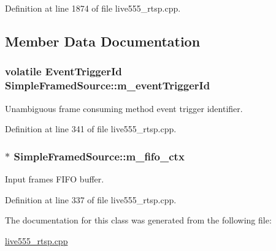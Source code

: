 Definition at line 1874 of file live555\+\_\+rtsp.\+cpp.



\subsection{Member Data Documentation}
\subsubsection[{\texorpdfstring{m\+\_\+event\+Trigger\+Id}{m_eventTriggerId}}]{\setlength{\rightskip}{0pt plus 5cm}volatile Event\+Trigger\+Id Simple\+Framed\+Source\+::m\+\_\+event\+Trigger\+Id}\hypertarget{classSimpleFramedSource_a6de7be242a550522e914316487fa112e}{}\label{classSimpleFramedSource_a6de7be242a550522e914316487fa112e}
Unambiguous frame consuming method event trigger identifier. 

Definition at line 341 of file live555\+\_\+rtsp.\+cpp.

\subsubsection[{\texorpdfstring{m\+\_\+fifo\+\_\+ctx}{m_fifo_ctx}}]{$\ast$ Simple\+Framed\+Source\+::m\+\_\+fifo\+\_\+ctx}\hypertarget{classSimpleFramedSource_ab93999240c393d2d3035dc7e5292eb2c}{}\label{classSimpleFramedSource_ab93999240c393d2d3035dc7e5292eb2c}
Input frames F\+I\+FO buffer. 

Definition at line 337 of file live555\+\_\+rtsp.\+cpp.



The documentation for this class was generated from the following file\+:\begin{DoxyCompactItemize}
\item 
\hyperlink{live555__rtsp_8cpp}{live555\+\_\+rtsp.\+cpp}\end{DoxyCompactItemize}
